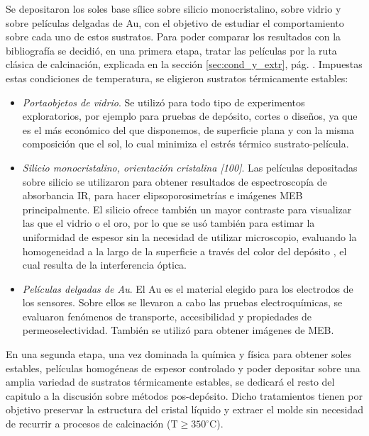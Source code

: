 	Se depositaron los soles base sílice sobre silicio monocristalino, sobre vidrio y sobre películas delgadas de Au, con el objetivo de estudiar el comportamiento sobre cada uno de estos sustratos. Para poder comparar los resultados con la bibliografía\cite{Soler-Illia2006,Brinker1990} se decidió, en una primera etapa, tratar las películas por la ruta clásica de calcinación, explicada en la sección \ref{sec:cond_y_extr}, pág. \pageref{sec:cond_y_extr}. Impuestas estas condiciones de temperatura, se eligieron sustratos térmicamente estables:

		\begin{itemize}

			\item \textit{Portaobjetos de vidrio}. Se utilizó para todo tipo de experimentos exploratorios, por ejemplo para pruebas de depósito, cortes o diseños, ya que es el más económico del que disponemos, de superficie plana y con la misma composición que el sol, lo cual minimiza el estrés térmico sustrato-película.

			\item \textit{Silicio monocristalino, orientación cristalina [100]}. Las películas depositadas sobre silicio se utilizaron para obtener resultados de espectroscopía de absorbancia IR, para hacer elipsoporosimetrías e imágenes MEB principalmente. El silicio ofrece también un mayor contraste para visualizar las \pdm\space que el vidrio o el oro, por lo que se usó también para estimar la uniformidad de espesor sin la necesidad de utilizar microscopio, evaluando la homogeneidad a la largo de la superficie a través del color del depósito , el cual resulta de la interferencia óptica.
		
			\item \textit{Películas delgadas de Au}. El Au es el material elegido para los electrodos de los sensores. Sobre ellos se llevaron a cabo las pruebas electroquímicas, se evaluaron fenómenos de transporte, accesibilidad y propiedades de permeoselectividad. También se utilizó para obtener imágenes de MEB. 

			\end{itemize}
	
	En una segunda etapa, una vez dominada la química y física para obtener soles estables, películas homogéneas de espesor controlado y poder depositar sobre una amplia variedad de sustratos térmicamente estables, se dedicará el resto del capitulo a la discusión sobre métodos pos-depósito. Dicho tratamientos tienen por objetivo preservar la estructura del cristal líquido y extraer el molde sin necesidad de recurrir a procesos de calcinación ($\text{T} \geq 350^\circ \text{C}$).

